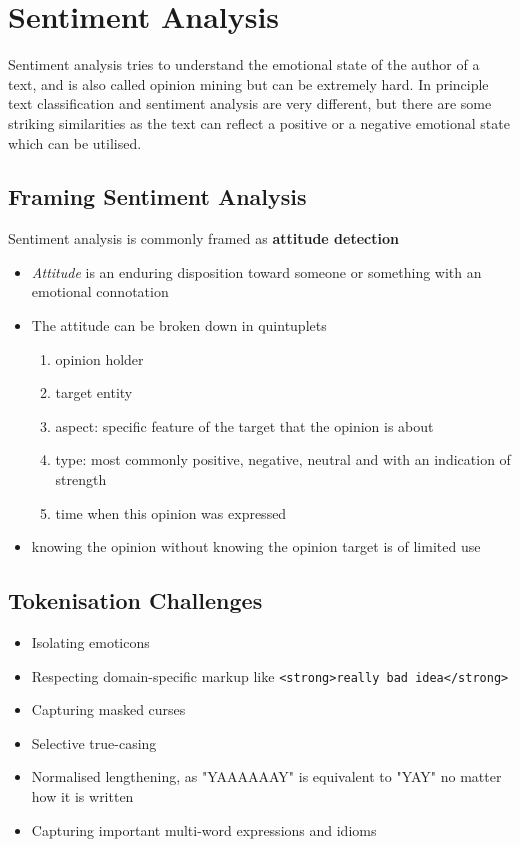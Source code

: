 \documentclass[11pt]{article}
\begin{document}
\section{Sentiment Analysis}
Sentiment analysis tries to understand the emotional state of the author of a text, and is also called opinion mining but can be extremely hard. In principle text classification and sentiment analysis are very different, but there are some striking similarities as the text can reflect a positive or a negative emotional state which can be utilised.

\subsection{Framing Sentiment Analysis}
Sentiment analysis is commonly framed as \textbf{attitude detection}
\begin{itemize}
	\item \emph{Attitude} is an enduring disposition toward someone or something with an emotional connotation
	\item The attitude can be broken down in quintuplets
	\begin{enumerate}
		\item opinion holder
		\item target entity
		\item aspect: specific feature of the target that the opinion is about
		\item type: most commonly {\color{Green3} positive}, {\color{Firebrick3} negative}, {\color{gray} neutral} and with an indication of strength
		\item time when this opinion was expressed
	\end{enumerate}
	\item knowing the opinion without knowing the opinion target is of limited use
\end{itemize}

\subsection{Tokenisation Challenges}
\begin{itemize}
	\item Isolating emoticons
	\item Respecting domain-specific markup like \texttt{<strong>really bad idea</strong>}
	\item Capturing masked curses
	\item Selective true-casing
	\item Normalised lengthening, as "YAAAAAAY" is equivalent to "YAY" no matter how it is written
	\item Capturing important multi-word expressions and idioms
\end{itemize}
\end{document}
